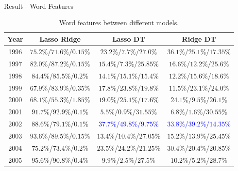 \documentclass{beamer}
\begin{document}
\begin{frame}{Result - Word Features}

  \begin{table}[H]
    \footnotesize
    \centering
    \begin{tabular}{|c|c|c|c|}
      \hline
      Year & Lasso Ridge                & Lasso DT                                     & Ridge DT                                      \\
      \hline
      1996 & $75.2\%$/$71.6\%$/$0.15\%$ & $23.2\%$/$7.7\%$/$27.0\%$                    & $36.1\%$/$25.1\%$/$17.35\%$                   \\
      \hline
      1997 & $82.0\%$/$87.2\%$/$0.15\%$ & $15.4\%$/$7.3\%$/$25.85\%$                   & $16.6\%$/$12.2\%$/$25.6\%$                    \\
      \hline
      1998 & $84.4\%$/$85.5\%$/$0.2\%$  & $14.1\%$/$15.1\%$/$15.4\%$                   & $12.2\%$/$15.6\%$/$18.6\%$                    \\
      \hline
      1999 & $67.9\%$/$83.9\%$/$0.35\%$ & $17.8\%$/$23.8\%$/$19.8\%$                   & $11.5\%$/$23.1\%$/$24.0\%$                    \\
      \hline
      2000 & $68.1\%$/$55.3\%$/$1.85\%$ & $19.0\%$/$25.1\%$/$17.6\%$                   & $24.1\%$/$9.5\%$/$26.1\%$                     \\
      \hline
      2001 & $91.7\%$/$92.9\%$/$0.1\%$  & $5.5\%$/$0.9\%$/$31.55\%$                    & $6.8\%$/$1.6\%$/$30.55\%$                     \\
      \hline
      2002 & $88.6\%$/$79.1\%$/$0.1\%$  & \textcolor{blue}{$37.7\%$/$49.8\%$/$9.75\%$} & \textcolor{blue}{$33.8\%$/$39.2\%$/$14.35\%$} \\
      \hline
      2003 & $93.6\%$/$89.5\%$/$0.15\%$ & $13.4\%$/$10.4\%$/$27.05\%$                  & $15.2\%$/$13.9\%$/$25.45\%$                   \\
      \hline
      2004 & $75.2\%$/$73.4\%$/$0.2\%$  & $23.5\%$/$24.2\%$/$21.25\%$                  & $30.4\%$/$20.4\%$/$20.85\%$                   \\
      \hline
      2005 & $95.6\%$/$90.8\%$/$0.4\%$  & $9.9\%$/$2.5\%$/$27.5\%$                     & $10.2\%$/$5.2\%$/$28.7\%$                     \\
      \hline
    \end{tabular}
    \caption{Word features between different models.}
  \end{table}

\end{frame}
\end{document}
